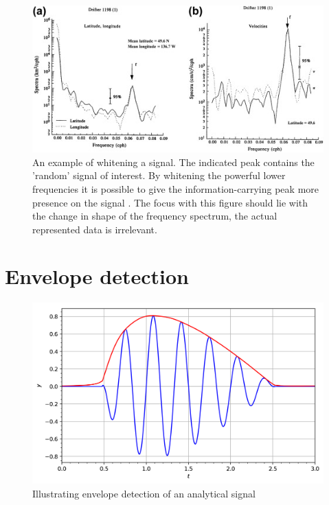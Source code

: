 \begin{figure}[h!t]
	\begin{center}
		\includegraphics[width=0.7\columnwidth]{images/prewhitening_example.jpg}
	\end{center}
	\caption{An example of whitening a signal. The indicated peak contains the 'random' signal of interest. By whitening the powerful lower frequencies it is possible to give the information-carrying peak more presence on the signal \cite{time_series_analysis_methods}. The focus with this figure should lie with the change in shape of the frequency spectrum, the actual represented data is irrelevant.}
	\label{fig:whitening_example}
\end{figure}


\section{Envelope detection}

\begin{figure}[h!t]
	\begin{center}
		\includegraphics[width=0.7\columnwidth]{images/envelope_wikipedia.png}
	\end{center}
	\caption{Illustrating envelope detection of an analytical signal \cite{envelope_wikipedia}}
	\label{fig:envelope_wikipedia}
\end{figure}

